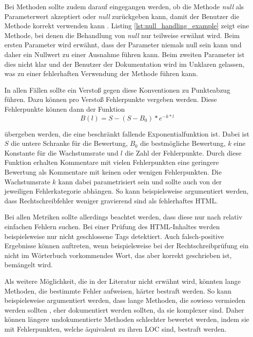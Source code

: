 Bei Methoden sollte zudem darauf eingegangen werden, ob die Methode \textit{null} als Parameterwert akzeptiert oder \textit{null} zurückgeben kann, damit der Benutzer die Methode korrekt verwenden kann \cite{@tComment:TestingJavadocCommentstoDetectComment-CodeInconsistencies}. Listing \ref{lst:null_handling_example} zeigt eine Methode, bei denen die Behandlung von \textit{null} nur teilweise erwähnt wird. Beim ersten Parameter wird erwähnt, dass der Parameter niemals null sein kann und daher ein Nullwert zu einer Ausnahme führen kann.  Beim zweiten Parameter ist dies nicht klar und der Benutzer der Dokumentation wird im Unklaren gelassen, was zu einer fehlerhaften Verwendung der Methode führen kann.

In allen Fällen sollte ein Verstoß gegen diese Konventionen zu Punkteabzug führen.
Dazu können pro Verstoß Fehlerpunkte vergeben werden. Diese Fehlerpunkte können dann der Funktion 
\begin{equation}
     B(l)=S-(S-B_0)*e^{-k*l}
 \end{equation} 
 
 übergeben werden, die eine beschränkt fallende Exponentialfunktion ist. Dabei ist $S$ die untere Schranke für die Bewertung, $B_0$ die bestmögliche Bewertung,  $k$ eine Konstante für die Wachstumsrate und $l$ die Zahl der Fehlerpunkte. Durch diese Funktion erhalten Kommentare mit vielen Fehlerpunkten eine geringere Bewertung als Kommentare mit keinen oder wenigen Fehlerpunkten. Die Wachstumsrate $k$ kann dabei parametrisiert sein und sollte auch von der jeweiligen Fehlerkategorie abhängen. So kann beispielsweise argumentiert werden, dass Rechtschreibfehler weniger gravierend sind als fehlerhaftes \ac{HTML}. 
 
 Bei allen Metriken sollte allerdings beachtet werden, dass diese nur nach relativ einfachen Fehlern suchen. Bei einer Prüfung des \ac{HTML}-Inhaltes werden beispielsweise nur nicht geschlossene Tags detektiert. Auch falsch-positive Ergebnisse können auftreten, wenn beispielsweise bei der Rechtschreibprüfung ein nicht im Wörterbuch vorkommendes Wort, das aber korrekt geschrieben ist, bemängelt wird.   
 
 Als weitere Möglichkeit, die in der Literatur nicht erwähnt wird, könnten lange Methoden, die bestimmte Fehler aufweisen, härter bestraft werden. So kann beispielsweise argumentiert werden, dass lange Methoden, die sowieso vermieden werden sollten \cite[S.~34]{martin2009clean}, eher dokumentiert werden sollten, da sie komplexer sind. Daher können längere undokumentierte Methoden schlechter bewertet werden, indem sie mit Fehlerpunkten, welche äquivalent zu ihren \ac{LOC} sind, bestraft werden. 

